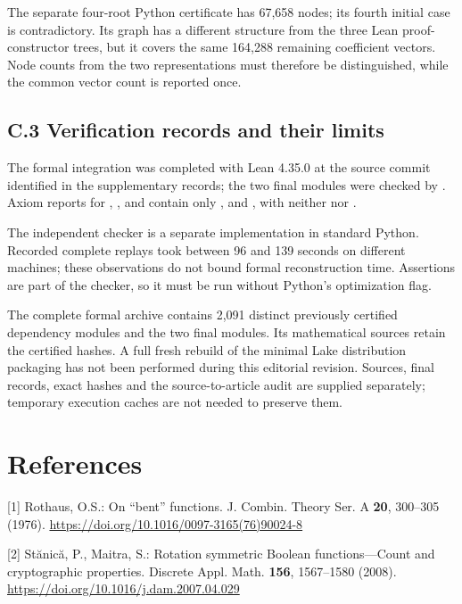 \documentclass[11pt,a4paper]{article}
\begin{document}
The separate four-root Python certificate has 67,658 nodes; its fourth initial case is contradictory. Its graph has a different structure from the three Lean proof-constructor trees, but it covers the same 164,288 remaining coefficient vectors. Node counts from the two representations must therefore be distinguished, while the common vector count is reported once.

\subsection*{C.3 Verification records and their limits}

The formal integration was completed with Lean 4.35.0 at the source commit identified in the supplementary records; the two final modules were checked by . Axiom reports for , ,  and  contain only ,  and , with neither  nor .

The independent checker is a separate implementation in standard Python. Recorded complete replays took between 96 and 139 seconds on different machines; these observations do not bound formal reconstruction time. Assertions are part of the checker, so it must be run without Python's optimization flag.

The complete formal archive contains 2,091 distinct previously certified dependency modules and the two final modules. Its mathematical sources retain the certified hashes. A full fresh rebuild of the minimal Lake distribution packaging has not been performed during this editorial revision. Sources, final records, exact hashes and the source-to-article audit are supplied separately; temporary execution caches are not needed to preserve them.

\clearpage
\section*{References}

[1] Rothaus, O.S.: On ``bent'' functions. J. Combin. Theory Ser. A \textbf{20}, 300--305 (1976). \url{https://doi.org/10.1016/0097-3165(76)90024-8}

[2] St\u{a}nic\u{a}, P., Maitra, S.: Rotation symmetric Boolean functions---Count and cryptographic properties. Discrete Appl. Math. \textbf{156}, 1567--1580 (2008). \url{https://doi.org/10.1016/j.dam.2007.04.029}
\end{document}
